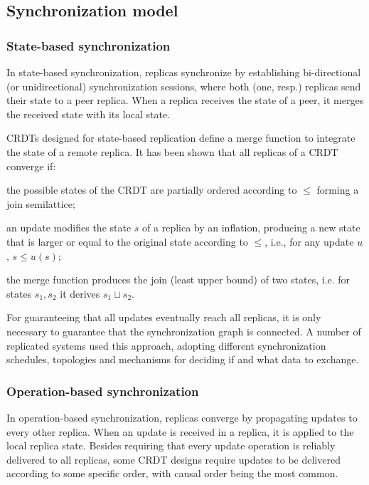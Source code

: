 \documentclass[11pt,a4paper]{article}
\begin{document}
\subsection{Synchronization model}

\subsubsection{State-based synchronization}\label{sec:sysdev:state}
In state-based synchronization, replicas synchronize by establishing bi-direc\-tional (or
unidirectional) synchronization sessions, where both (one, resp.) replicas send
their state to a peer replica. 
When a replica receives the state of a peer, it merges the received state with 
its local state.

CRDTs designed for state-based replication define a merge function to 
integrate the state of a remote replica.
It has been shown \cite{Shapiro11Conflict} that all replicas of a CRDT converge if: 
\begin{inparaenum}[(i)] 
\item the possible states of the CRDT are partially ordered according to $\leq$ forming a 
join semilattice;
\item an update modifies the state $s$ of a replica by an inflation, producing a new state that is
larger or equal to the original state according to $\leq$, 
  i.e., for any update $u$, $s \leq u(s)$;
\item the merge function produces the join (least upper bound) of two states, 
i.e. for states $s_1,s_2$ it derives $s_1 \sqcup s_2$. 
\end{inparaenum}

For guaranteeing that all updates eventually reach all replicas, it is only necessary 
to guarantee that the synchronization graph is connected.
A number of replicated systems \cite{lotusnotes,Ratner99Peer,dynamo} used this approach,
adopting different synchronization schedules, topologies and mechanisms 
for deciding if and what data to exchange.

\subsubsection{Operation-based synchronization}

In operation-based synchronization, replicas converge by propagating updates 
to every other replica.
When an update is received in a replica, it is applied to the local replica
state.
Besides requiring that every update operation is reliably delivered to all replicas,
some CRDT designs require updates to be delivered according to some specific order,
with causal order being the most common.
\end{document}
